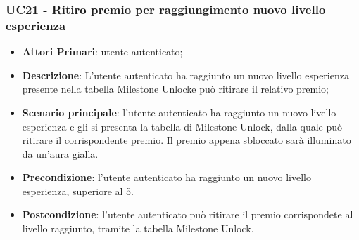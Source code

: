 \subsubsection{UC21 - Ritiro premio per raggiungimento nuovo livello esperienza}
\begin{itemize}
	\item \textbf{Attori Primari}: utente autenticato;
	\item \textbf{Descrizione}: L'utente autenticato ha raggiunto un nuovo livello esperienza presente nella tabella Milestone Unlock\glosp e può ritirare il relativo premio;	
	\item \textbf{Scenario principale}: l'utente autenticato ha raggiunto un nuovo livello esperienza e gli si presenta la tabella di Milestone Unlock, dalla quale può ritirare il corrispondente premio. Il premio appena sbloccato sarà illuminato da un'aura gialla.
	\item \textbf{Precondizione}: l'utente autenticato ha raggiunto un nuovo livello esperienza, superiore al 5.
	\item \textbf{Postcondizione}: l'utente autenticato può ritirare il premio corrispondete al livello raggiunto, tramite la tabella Milestone Unlock.
\end{itemize}
